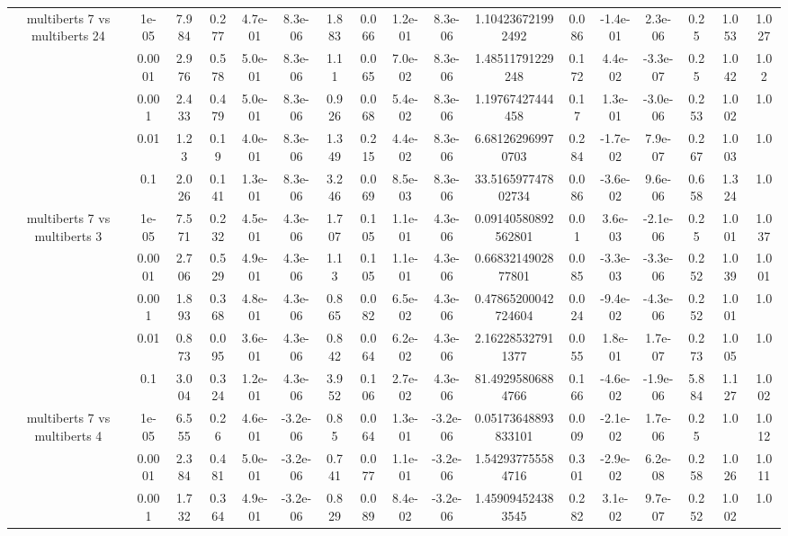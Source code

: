 \begin{tabular}{|c|c|c|c|c|c|c|c|c|c|c|c|c|c|c|c|c|}
\hline
\multirow{5}{*}{multiberts 7 vs multiberts 24} & 1e-05 & 7.984 & 0.277 & 4.7e-01 & 8.3e-06 & 1.883 & 0.066 & 1.2e-01 & 8.3e-06 & 1.104236721992492 & 0.086 & -1.4e-01 & 2.3e-06 & 0.25 & 1.053 & 1.027 \\
 & 0.0001 & 2.976 & 0.578 & 5.0e-01 & 8.3e-06 & 1.11 & 0.065 & 7.0e-02 & 8.3e-06 & 1.48511791229248 & 0.172 & 4.4e-02 & -3.3e-07 & 0.25 & 1.042 & 1.02 \\
 & 0.001 & 2.433 & 0.479 & 5.0e-01 & 8.3e-06 & 0.926 & 0.068 & 5.4e-02 & 8.3e-06 & 1.19767427444458 & 0.17 & 1.3e-01 & -3.0e-06 & 0.253 & 1.002 & 1.0 \\
 & 0.01 & 1.23 & 0.19 & 4.0e-01 & 8.3e-06 & 1.349 & 0.215 & 4.4e-02 & 8.3e-06 & 6.681262969970703 & 0.284 & -1.7e-02 & 7.9e-07 & 0.267 & 1.003 & 1.0 \\
 & 0.1 & 2.026 & 0.141 & 1.3e-01 & 8.3e-06 & 3.246 & 0.069 & 8.5e-03 & 8.3e-06 & 33.516597747802734 & 0.086 & -3.6e-02 & 9.6e-06 & 0.658 & 1.324 & 1.0 \\
\hline
\multirow{5}{*}{multiberts 7 vs multiberts 3} & 1e-05 & 7.571 & 0.232 & 4.5e-01 & 4.3e-06 & 1.707 & 0.105 & 1.1e-01 & 4.3e-06 & 0.09140580892562801 & 0.01 & 3.6e-03 & -2.1e-06 & 0.25 & 1.001 & 1.037 \\
 & 0.0001 & 2.706 & 0.529 & 4.9e-01 & 4.3e-06 & 1.13 & 0.105 & 1.1e-01 & 4.3e-06 & 0.6683214902877801 & 0.085 & -3.3e-03 & -3.3e-06 & 0.252 & 1.039 & 1.001 \\
 & 0.001 & 1.893 & 0.368 & 4.8e-01 & 4.3e-06 & 0.865 & 0.082 & 6.5e-02 & 4.3e-06 & 0.47865200042724604 & 0.024 & -9.4e-02 & -4.3e-06 & 0.252 & 1.001 & 1.0 \\
 & 0.01 & 0.873 & 0.095 & 3.6e-01 & 4.3e-06 & 0.842 & 0.064 & 6.2e-02 & 4.3e-06 & 2.162285327911377 & 0.055 & 1.8e-01 & 1.7e-07 & 0.273 & 1.005 & 1.0 \\
 & 0.1 & 3.004 & 0.324 & 1.2e-01 & 4.3e-06 & 3.952 & 0.106 & 2.7e-02 & 4.3e-06 & 81.49295806884766 & 0.166 & -4.6e-02 & -1.9e-06 & 5.884 & 1.127 & 1.002 \\
\hline
\multirow{5}{*}{multiberts 7 vs multiberts 4} & 1e-05 & 6.555 & 0.26 & 4.6e-01 & -3.2e-06 & 0.85 & 0.064 & 1.3e-01 & -3.2e-06 & 0.05173648893833101 & 0.009 & -2.1e-02 & 1.7e-06 & 0.25 & 1.0 & 1.012 \\
 & 0.0001 & 2.384 & 0.481 & 5.0e-01 & -3.2e-06 & 0.741 & 0.077 & 1.1e-01 & -3.2e-06 & 1.542937755584716 & 0.301 & -2.9e-02 & 6.2e-08 & 0.258 & 1.026 & 1.011 \\
 & 0.001 & 1.732 & 0.364 & 4.9e-01 & -3.2e-06 & 0.829 & 0.089 & 8.4e-02 & -3.2e-06 & 1.459094524383545 & 0.282 & 3.1e-02 & 9.7e-07 & 0.252 & 1.002 & 1.0 \\

\end{tabular}
